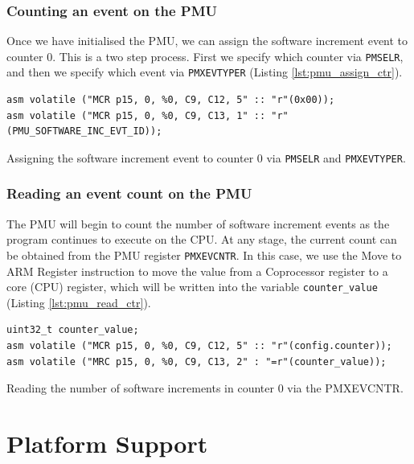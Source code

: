 {\subsubsection{Counting an event on the PMU}

Once we have initialised the PMU, we can assign the software increment event to counter 0. This is a two step process. First we specify which counter via \texttt{PMSELR}, and then we specify which event via \texttt{PMXEVTYPER} (Listing \ref{lst:pmu_assign_ctr}).

\begin{listing}
    \begin{verbatim}
asm volatile ("MCR p15, 0, %0, C9, C12, 5" :: "r"(0x00));
asm volatile ("MCR p15, 0, %0, C9, C13, 1" :: "r"(PMU_SOFTWARE_INC_EVT_ID));
    \end{verbatim}
    \caption{Assigning the software increment event to counter 0 via \texttt{PMSELR} and \texttt{PMXEVTYPER}.} 
    \label{lst:pmu_assign_ctr}
\end{listing}

\subsubsection{Reading an event count on the PMU}

The PMU will begin to count the number of software increment events as the program continues to execute on the CPU. At any stage, the current count can be obtained from the PMU register \texttt{PMXEVCNTR}. In this case, we use the Move to ARM Register \cite{DocsArmMRC} instruction to move the value from a Coprocessor register to a core (CPU) register, which will be written into the variable \texttt{counter\_value} (Listing \ref{lst:pmu_read_ctr}).

\begin{listing}
    \begin{verbatim}
uint32_t counter_value;
asm volatile ("MCR p15, 0, %0, C9, C12, 5" :: "r"(config.counter));
asm volatile ("MRC p15, 0, %0, C9, C13, 2" : "=r"(counter_value));
    \end{verbatim}
    \caption{Reading the number of software increments in counter 0 via the PMXEVCNTR.} 
    \label{lst:pmu_read_ctr}
\end{listing}

\section{Platform Support}\label{sect:platform_support}

}
